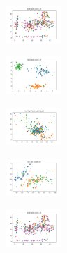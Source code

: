 \begin{figure}[H]
    \hfill
    \begin{subfigure}
        \centering
        \includegraphics[width=0.234\textwidth]{img/hs-ls/ecoli_set_const_20_589741062_clust.png}
    \end{subfigure}
    \hfill
    \begin{subfigure}
        \centering
        \includegraphics[width=0.234\textwidth]{img/hs-ls/rand_set_const_20_589741062_clust.png}
    \end{subfigure}
    \hfill
    \begin{subfigure}
        \centering
        \includegraphics[width=0.234\textwidth]{img/hs-ls/newthyroid_set_const_20_589741062_clust.png}
    \end{subfigure}
    \hfill
    \begin{subfigure}
        \centering
        \includegraphics[width=0.234\textwidth]{img/hs-ls/iris_set_const_20_277451237_clust.png}
    \end{subfigure}
    \hfill
    \begin{subfigure}
        \centering
        \includegraphics[width=0.234\textwidth]{img/hs-ls/ecoli_set_const_20_277451237_clust.png}
    \end{subfigure}
    \hfill
    \begin{subfigure}

\end{subfigure}
\end{figure}
